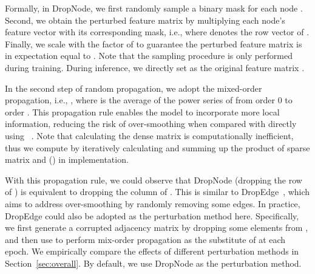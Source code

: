 Formally, in DropNode, we first 
randomly sample a binary mask  for each node .
Second, we obtain the perturbed feature matrix  by multiplying each node's feature vector with its corresponding mask, i.e.,  where  denotes the  row vector of . 
Finally,  we scale  with the factor of  to guarantee the perturbed feature matrix is in expectation equal to . 
Note that the sampling procedure is only performed during training. 
During inference, we directly set  as the original feature matrix . 


In the second step of random propagation, we adopt the mixed-order propagation, i.e., , where   is the average of the power series of  from order 0 to order . 
This propagation rule enables the model to incorporate more local information, reducing the risk of over-smoothing when compared with directly using ~\cite{abu2019mixhop,xu2018representation}. Note that calculating the dense matrix  is computationally inefficient, thus we compute  by iteratively calculating and summing up the product of  sparse matrix  and  () in implementation.


With this propagation rule, we could observe that DropNode (dropping the  row of ) is equivalent to dropping the  column of . This is similar to DropEdge~\cite{YuDropedge}, which aims to address over-smoothing by randomly removing some edges. In practice, DropEdge could also be adopted as the perturbation method here. Specifically, we first generate a corrupted adjacency matrix  by dropping some elements from , and then use  to perform mix-order propagation as the substitute of   at each epoch. We empirically compare the effects of different perturbation methods in Section~\ref{sec:overall}. By default, we use DropNode as the perturbation method. 









